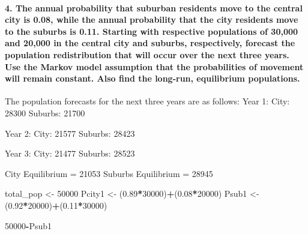 \documentclass[
]{article}
\newenvironment{Shaded}{\begin{snugshade}}{\end{snugshade}}
\newcommand{\DecValTok}[1]{\textcolor[rgb]{0.00,0.00,0.81}{#1}}
\newcommand{\FloatTok}[1]{\textcolor[rgb]{0.00,0.00,0.81}{#1}}
\newcommand{\NormalTok}[1]{#1}
\newcommand{\OtherTok}[1]{\textcolor[rgb]{0.56,0.35,0.01}{#1}}
\newcommand{\SpecialCharTok}[1]{\textcolor[rgb]{0.81,0.36,0.00}{\textbf{#1}}}
\begin{document}
\hypertarget{the-annual-probability-that-suburban-residents-move-to-the-central-city-is-0.08-while-the-annual-probability-that-the-city-residents-move-to-the-suburbs-is-0.11.-starting-with-respective-populations-of-30000-and-20000-in-the-central-city-and-suburbs-respectively-forecast-the-population-redistribution-that-will-occur-over-the-next-three-years.-use-the-markov-model-assumption-that-the-probabilities-of-movement-will-remain-constant.-also-find-the-long-run-equilibrium-populations.}{%
\paragraph{4. The annual probability that suburban residents move to the
central city is 0.08, while the annual probability that the city
residents move to the suburbs is 0.11. Starting with respective
populations of 30,000 and 20,000 in the central city and suburbs,
respectively, forecast the population redistribution that will occur
over the next three years. Use the Markov model assumption that the
probabilities of movement will remain constant. Also find the long-run,
equilibrium
populations.}\label{the-annual-probability-that-suburban-residents-move-to-the-central-city-is-0.08-while-the-annual-probability-that-the-city-residents-move-to-the-suburbs-is-0.11.-starting-with-respective-populations-of-30000-and-20000-in-the-central-city-and-suburbs-respectively-forecast-the-population-redistribution-that-will-occur-over-the-next-three-years.-use-the-markov-model-assumption-that-the-probabilities-of-movement-will-remain-constant.-also-find-the-long-run-equilibrium-populations.}}

The population forecasts for the next three years are as follows: Year
1: City: 28300 Suburbs: 21700

Year 2: City: 21577 Suburbs: 28423

Year 3: City: 21477 Suburbs: 28523

City Equilibrium = 21053 Suburbs Equilibrium = 28945

\begin{Shaded}
\begin{Highlighting}[]
\NormalTok{total\_pop }\OtherTok{\textless{}{-}} \DecValTok{50000}
\NormalTok{Pcity1 }\OtherTok{\textless{}{-}}\NormalTok{ (}\FloatTok{0.89}\SpecialCharTok{*}\DecValTok{30000}\NormalTok{)}\SpecialCharTok{+}\NormalTok{(}\FloatTok{0.08}\SpecialCharTok{*}\DecValTok{20000}\NormalTok{)}
\NormalTok{Psub1 }\OtherTok{\textless{}{-}}\NormalTok{ (}\FloatTok{0.92}\SpecialCharTok{*}\DecValTok{20000}\NormalTok{)}\SpecialCharTok{+}\NormalTok{(}\FloatTok{0.11}\SpecialCharTok{*}\DecValTok{30000}\NormalTok{)}

\DecValTok{50000}\SpecialCharTok{{-}}\NormalTok{Psub1}
\end{Highlighting}
\end{Shaded}
\end{document}

